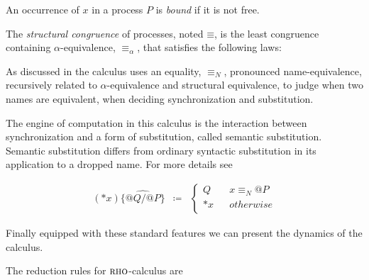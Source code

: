 \documentclass[submission,copyright,creativecommons]{eptcs}
\makeatletter
\newcommand{\id}[1]{\texttt{#1}}
\newcommand{\pzero}{\mathbin{0}}
\newcommand{\juxtap}{\mathbin{\id{|}}}
\newcommand{\concat}{\Rightarrow}
\newcommand{\scong}{\mathbin{\equiv}}
\newcommand{\nameeq}{\mathbin{\equiv_N}}
\newcommand{\alphaeq}{\mathbin{\equiv_{\alpha}}}
\newcommand{\quotep}[1]{@#1}
\newcommand{\dropn}[1]{*#1}
\newcommand{\substp}[2]{\id{\{} \quotep{#1} / \quotep{#2} \id{\}}}
\newcommand{\psubstp}[2]{\widehat{\substp{#1}{#2}}}
\newcommand{\defneqls}{\coloneqq}
\newcommand{\red}{\rightarrow}
\numberwithin{equation}{subsection}
\newcommand{\rhoc}{${\textsc{rho}}$-calculus}
\makeatother
\begin{document}
An occurrence of $x$ in a process $P$ is \textit{bound} if it is not
free. 

The {\em structural congruence} of processes, noted $\scong$, is the
least congruence containing $\alpha$-equivalence, $\alphaeq$, that
satisfies the following laws:


As discussed in \cite{DBLP:conf/tgc/MeredithR05} the calculus uses an
equality, $\nameeq$, pronounced name-equivalence, recursively related
to $\alpha$-equivalence and structural equivalence, to judge when two
names are equivalent, when deciding synchronization and substitution.

The engine of computation in this calculus is the interaction between
synchronization and a form of substitution, called semantic
substitution. Semantic substitution differs from ordinary syntactic
substitution in its application to a dropped name. For more details
see \cite{DBLP:journals/entcs/MeredithR05}

\begin{eqnarray*}
(\dropn{x})  \psubstp{Q}{P}       
		& \defneqls & 
		\left\{ 
			\begin{array}{ccc} 
				Q & & x \nameeq \quotep{P} \\
                              	\dropn{x} & & otherwise \\
			\end{array}
		\right.
\end{eqnarray*}

Finally equipped with these standard features we can present the
dynamics of the calculus.

The reduction rules for {\rhoc}  are
\end{document}
